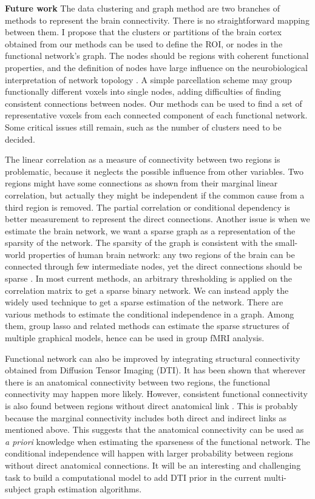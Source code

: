 \documentclass[]{article}
\begin{document}
\textbf{Future work} The data clustering and graph method are two branches of
methods to represent the brain connectivity. There is no straightforward mapping
between them. I propose that the clusters or partitions of the brain cortex
obtained from our methods can be used to define the ROI, or nodes in the
functional network's graph. The nodes should be regions with coherent functional
properties, and the definition of nodes have large influence on the
neurobiological interpretation of network topology \cite{butts2009revisiting}. A
simple parcellation scheme may group functionally different voxels into single
nodes, adding difficulties of finding consistent connections between nodes. Our
methods can be used to find a set of representative voxels from each connected
component of each functional network. Some critical issues still remain, such as
the number of clusters need to be decided.


The linear correlation as a measure of connectivity between two regions is
problematic, because it neglects the possible influence from other
variables. Two regions might have some connections as shown from their marginal
linear correlation, but actually they might be independent if the common cause
from a third region is removed. The partial correlation or conditional
dependency is  better measurement to represent the direct
connections. Another issue is when we estimate the brain network, we want a
sparse graph as a representation of the sparsity of the network. The
sparsity of the graph is consistent with the small-world properties of human
brain network: any two regions of the brain can be connected through few
intermediate nodes, yet the direct connections should be sparse
\citep{varoquaux2010brain}. In most current methods, an arbitrary thresholding
is applied on the correlation matrix to get a sparse binary network. We can
instead apply the widely used  technique to
get a sparse estimation of the network. There are various methods to estimate the
conditional independence in a graph. Among them, group lasso
\cite{yuan2006model} and related methods can estimate the sparse structures of
multiple graphical models, hence can be used in group fMRI analysis.

Functional network can also be improved by integrating structural connectivity
obtained from Diffusion Tensor Imaging (DTI). It has been shown that wherever there is
an anatomical connectivity between two regions, the functional connectivity may
happen more likely. However, consistent functional connectivity is also found
between regions without direct anatomical link \citep{deco2010emerging}. This is
probably because the marginal connectivity includes both direct and indirect
links as mentioned above. This suggests that the anatomical connectivity can be used as \emph{a
  priori} knowledge when estimating the sparseness of the functional
network. The conditional independence will happen with larger probability
between regions without direct anatomical connections. It will be an interesting 
and challenging task to build a computational model to add DTI prior
in the current multi-subject graph estimation algorithms.



\end{document}
